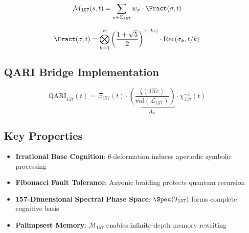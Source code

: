 \documentclass[12pt]{article}
\begin{document}
\begin{center}
\begin{equation}
\label{eq:memory}
\mathcal{M}_{157}(s,t) = \sum_{\sigma \in \Sigma_{157}} w_\sigma \cdot \Fract(\sigma,t)
\end{equation}

\begin{equation}
\Fract(\sigma,t) = \bigotimes_{k=1}^{|\sigma|} \left(\frac{1+\sqrt{5}}{2}\right)^{-\lfloor k\epsilon \rfloor} \cdot \text{Rec}(\sigma_k, t/k)
\end{equation}

\subsection*{QARI Bridge Implementation}

\begin{equation}
\label{eq:qari}
\text{QARI}_{157}(t) = \Xi_{157}(t) \cdot \underbrace{\left(\frac{\zeta(157)}{\text{vol}(\mathscr{L}_{157})}\right)}_{\Lambda_m} \cdot \chi_{157}^{-1}(t)
\end{equation}


\subsection*{Key Properties}

\begin{itemize}
\item \textbf{Irrational Base Cognition}: $\theta$-deformation induces aperiodic symbolic processing
\item \textbf{Fibonacci Fault Tolerance}: Anyonic braiding protects quantum recursion
\item \textbf{157-Dimensional Spectral Phase Space}: $\Spec(\mathcal{T}_{157})$ forms complete cognitive basis
\item \textbf{Palimpsest Memory}: $\mathcal{M}_{157}$ enables infinite-depth memory rewriting
\end{itemize}



\end{center}
\end{document}
